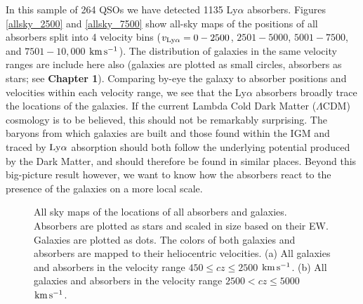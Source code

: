 \documentclass[twocolumn,tighten]{aastex62}
\newcommand{\kms}{$\rm km\, s^{-1}$}
\begin{document}
In this sample of 264 QSOs we have detected 1135 Ly$\alpha$ absorbers. Figures \ref{allsky_2500} and \ref{allsky_7500} show all-sky maps of the positions of all absorbers split into 4 velocity bins ($v_{\rm Ly\alpha} = 0 - 2500$, $2501 - 5000$, $5001 - 7500$, and $7501 - 10,000$ \kms). The distribution of galaxies in the same velocity ranges are include here also (galaxies are plotted as small circles, absorbers as stars; see \textbf{Chapter 1}). Comparing by-eye the galaxy to absorber positions and velocities within each velocity range, we see that the Ly$\alpha$ absorbers broadly trace the locations of the galaxies. If the current Lambda Cold Dark Matter ($\Lambda$CDM) cosmology is to be believed, this should not be remarkably surprising. The baryons from which galaxies are built and those found within the IGM and traced by $\rm Ly\alpha$ absorption should both follow the underlying potential produced by the Dark Matter, and should therefore be found in similar places. Beyond this big-picture result however, we want to know how the absorbers react to the presence of the galaxies on a more local scale.


\begin{figure}
\centering
  \label{allsky_2500}
  \label{allsky_5000}
  \caption{\small{All sky maps of the locations of all absorbers and galaxies. Absorbers are plotted as stars and scaled in size based on their EW. Galaxies are plotted as dots. The colors of both galaxies and absorbers are mapped to their heliocentric velocities. (a) All galaxies and absorbers in the velocity range $450 \leq cz \leq 2500$ \kms. (b) All galaxies and absorbers in the velocity range $2500 < cz \leq 5000$ \kms.}}
\vspace{0pt}
\end{figure}
\end{document}
